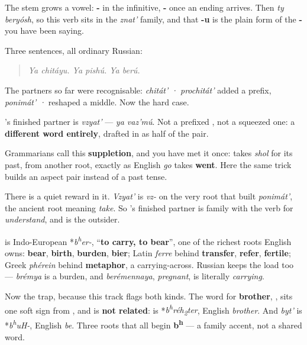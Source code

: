 The stem grows a vowel: \textbf{-} in the infinitive, \textbf{-} once an ending arrives. Then \emph{ty beryósh}, so this verb sits in the \emph{znat'} family, and that \textbf{-u} is the plain form of the \textbf{-} you have been saying.

Three sentences, all ordinary Russian:

\begin{quote}
\emph{Ya chitáyu. Ya pishú. Ya berú.}
\end{quote}

\begin{grammarlens}[title={Grammar Lens: a pair with nothing in common}]
The partners so far were recognisable: \emph{chitát' · prochitát'} added a prefix, \emph{ponimát' · } reshaped a middle. Now the hard case.

\textbf{}'s finished partner is \emph{vzyat'} — \emph{ya vaz'mú}. Not a prefixed \emph{}, not a squeezed one: a \textbf{different word entirely}, drafted in as half of the pair.

Grammarians call this \textbf{suppletion}, and you have met it once: \emph{} takes \emph{shol} for its past, from another root, exactly as English \emph{go} takes \textbf{went}. Here the same trick builds an aspect pair instead of a past tense.

There is a quiet reward in it. \emph{Vzyat'} is \emph{vz-} on the very root that built \emph{ponimát'}, the ancient root meaning \emph{take}. So \emph{}'s finished partner is family with the verb for \emph{understand}, and \emph{} is the outsider.
\end{grammarlens}

\begin{cousinweb}
\textbf{} is Indo-European *\emph{b\textsuperscript{h}er-}, \textquotedblleft{}\textbf{to carry, to bear}\textquotedblright{}, one of the richest roots English owns: \textbf{bear}, \textbf{birth}, \textbf{burden}, \textbf{bier}; Latin \emph{ferre} behind \textbf{transfer}, \textbf{refer}, \textbf{fertile}; Greek \emph{phérein} behind \textbf{metaphor}, a carrying-across. Russian keeps the load too — \emph{brémya} is a burden, and \emph{berémennaya}, \emph{pregnant}, is literally \emph{carrying}.

Now the trap, because this track flags both kinds. The word for \textbf{brother}, \textbf{}, sits one soft sign from \emph{}, and is \textbf{not related}: \emph{} is *\emph{b\textsuperscript{h}réh\textsubscript{2}ter}, English \emph{brother}. And \emph{byt'} is *\emph{b\textsuperscript{h}uH-}, English \emph{be}. Three roots that all begin \textbf{b\textsuperscript{h}} — a family accent, not a shared word.
\end{cousinweb}

